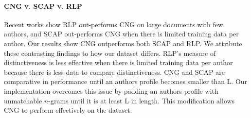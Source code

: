 \documentclass[twocolumn,10pt]{article}
\begin{document}


\paragraph{CNG v. SCAP v. RLP} Recent works show RLP out-performs CNG on large documents with few authors\supercite{layton2012recentred}, and SCAP out-performs CNG when there is limited training data per author\supercite{frantzeskou2006effective}. Our results show CNG outperforms both SCAP and RLP. We attribute these contrasting findings to how our dataset differs. RLP's measure of distinctiveness is less effective when there is limited training data per author because there is less data to compare distinctiveness. CNG and SCAP are comparative in performance until an authors profile becomes smaller than L\supercite{frantzeskou2006effective}. Our implementation overcomes this issue by padding an authors profile with unmatchable $n$-grams until it is at least L in length. This modification allows CNG to perform effectively on the dataset.
\end{document}
